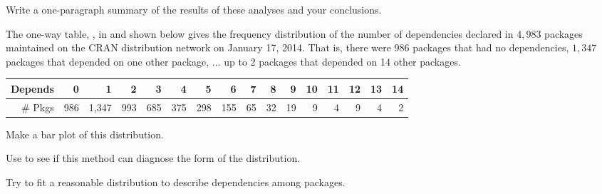 \documentclass[11pt]{report}\usepackage[]{graphicx}\usepackage[]{color}
\begin{document}
\begin{Exercises}
\begin{enumerate*}
    \item Write a one-paragraph summary of the results of these analyses and your
    conclusions.
    \begin{ans}
    \end{ans}
    
  \end{enumerate*}

\exercise\exhard
  The one-way table, , in  and shown below gives the frequency
  distribution of the number of dependencies declared in $4,983$ \R packages
  maintained on the CRAN distribution network on January 17, 2014. That is, there were 986
  packages that had no dependencies, $1,347$ packages that depended on one other package, $\dots$
  up to 2 packages that depended on 14 other packages.

\begin{table}[ht]
\centering
\begin{tabular}{r|rrrrrrrrrrrrrrr}
  \hline
Depends & 0 & 1 & 2 & 3 & 4 & 5 & 6 & 7 & 8 & 9 & 10 & 11 & 12 & 13 & 14 \\
  \hline
\# Pkgs & 986 & 1,347 & 993 & 685 & 375 & 298 & 155 &  65 &  32 &  19 &   9 &   4 &   9 &   4 &   2 \\
   \hline
\end{tabular}
\end{table}

    \begin{enumerate*}
      \item Make a bar plot of this distribution.
      \begin{ans}
      \end{ans}
      
      \item Use  to see if this method can diagnose the form of the distribution.
      \begin{ans}
      \end{ans}
      
      \item Try to fit a reasonable distribution to describe dependencies among \R packages.
      \begin{ans}
      \end{ans}
      
    \end{enumerate*}


\end{Exercises}
\end{document}
